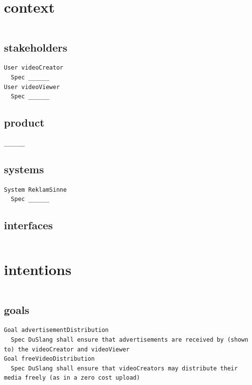 \documentclass[11pt]{article}
\begin{document}
%
%
\begin{framed}
\begin{lstlisting}
\end{lstlisting}
       \section*{context}
\begin{lstlisting}
\end{lstlisting}
       \subsection*{stakeholders}
\begin{lstlisting}
User videoCreator
  Spec ______
User videoViewer
  Spec ______
\end{lstlisting}
       \subsection*{product}
\begin{lstlisting}
______
\end{lstlisting}
       \subsection*{systems}
\begin{lstlisting}
System ReklamSinne
  Spec ______
\end{lstlisting}
       \subsection*{interfaces}
\begin{lstlisting}
\end{lstlisting}
       \section*{intentions}
\begin{lstlisting}
\end{lstlisting}
       \subsection*{goals}
\begin{lstlisting}
Goal advertisementDistribution
  Spec DuSlang shall ensure that advertisements are received by (shown to) the videoCreator and videoViewer
Goal freeVideoDistribution
  Spec DuSlang shall ensure that videoCreators may distribute their media freely (as in a zero cost upload)


\end{lstlisting}
\end{framed}
\end{document}
